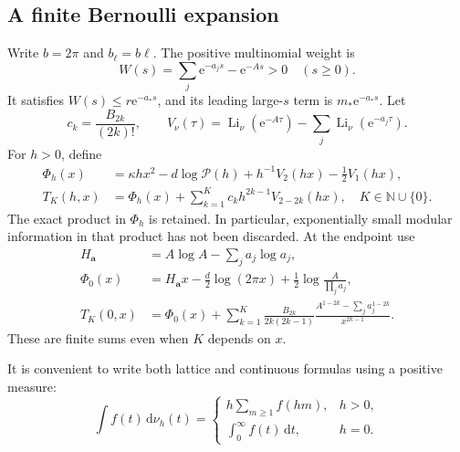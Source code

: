 \documentclass[11pt,a4paper]{article}
\numberwithin{equation}{section}
\theoremstyle{definition}\newtheorem{definition}[theorem]{Definition}
\theoremstyle{remark}\newtheorem{remark}[theorem]{Remark}
\newcommand{\e}{\mathrm e}
\newcommand{\dd}{\,\mathrm d}
\newcommand{\N}{\mathbb N}
\newcommand{\avec}{\boldsymbol a}
\newcommand{\astar}{a_*}
\newcommand{\mstar}{m_*}
\newcommand{\calP}{\mathcal P}
\DeclareMathOperator{\Li}{Li}
\begin{document}
\subsection{A finite Bernoulli expansion}
Write $b=2\pi$ and $b_\ell=b\ell$. The positive multinomial weight is
\begin{equation}
 W(s)=\sum_j\e^{-a_js}-\e^{-As}>0\quad(s\ge0).
 \label{eq:W}
\end{equation}
It satisfies $W(s)\le r\e^{-\astar s}$, and its leading large-$s$ term is
$\mstar\e^{-\astar s}$. Let
\begin{equation}
 c_k=\frac{B_{2k}}{(2k)!},\qquad
 V_\nu(\tau)=\Li_\nu(\e^{-A\tau})-\sum_j\Li_\nu(\e^{-a_j\tau}).
\end{equation}
For $h>0$, define
\begin{align}
 \Phi_h(x)&=\kappa hx^2-d\log\calP(h)
       +h^{-1}V_2(hx)-\tfrac12 V_1(hx),\\
 T_K(h,x)&=\Phi_h(x)+\sum_{k=1}^K c_kh^{2k-1}V_{2-2k}(hx),
 \quad K\in\N\cup\{0\}.
 \label{eq:TK}
\end{align}
The exact product in $\Phi_h$ is retained. In particular, exponentially
small modular information in that product has not been discarded.
At the endpoint use
\begin{align}
 H_{\avec}&=A\log A-\sum_j a_j\log a_j,\\
 \Phi_0(x)&=H_{\avec}x-\tfrac d2\log(2\pi x)
                     +\tfrac12\log\frac{A}{\prod_j a_j},\\
 T_K(0,x)&=\Phi_0(x)+\sum_{k=1}^K
 \frac{B_{2k}}{2k(2k-1)}
 \frac{A^{1-2k}-\sum_j a_j^{1-2k}}{x^{2k-1}}.
 \label{eq:Tzero}
\end{align}
These are finite sums even when $K$ depends on $x$.

It is convenient to write both lattice and continuous formulas using a
positive measure:
\begin{equation}
 \int f(t)\dd\nu_h(t)=
 \begin{cases}
 h\displaystyle\sum_{m\ge1}f(hm),&h>0,\\
 \displaystyle\int_0^\infty f(t)\dd t,&h=0.
 \end{cases}
 \label{eq:measure}
\end{equation}
\end{document}
